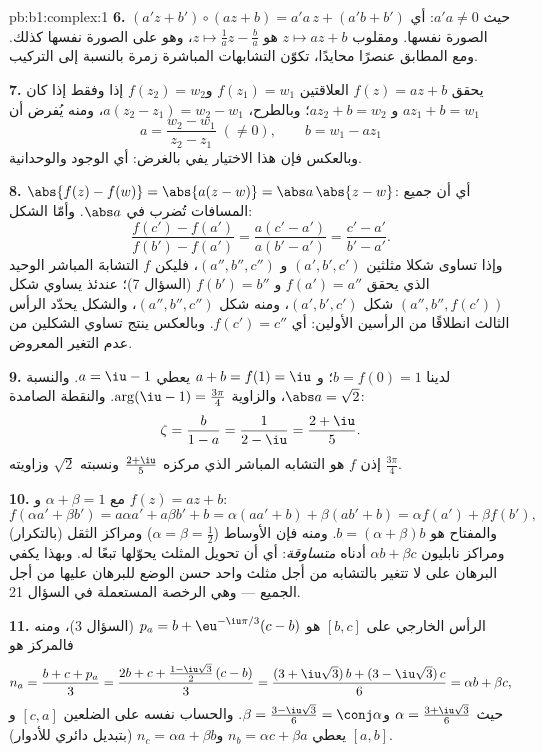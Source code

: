 \begin{solution}{pb:b1:complex:1}
\textbf{6.} $(a'z + b') \circ (az + b) = a'a\,z + (a'b + b')$ حيث
$a'a \neq 0$: أي الصورة نفسها. ومقلوب $z \mapsto az + b$ هو $z
\mapsto \frac1a z - \frac ba$، وهو على الصورة نفسها كذلك. ومع
 المطابق عنصرًا محايدًا، تكوّن التشابهات المباشرة
زمرة بالنسبة إلى التركيب.

\textbf{7.} يحقق $f(z) = az + b$ العلاقتين $f(z_1) = w_1$ و$f(z_2) =
w_2$ إذا وفقط إذا كان $a z_1 + b = w_1$ و $a z_2 + b = w_2$؛ وبالطرح،
$a(z_2 - z_1) = w_2 - w_1$، ومنه يُفرض أن
\[
a = \frac{w_2 - w_1}{z_2 - z_1} \;(\neq 0), \qquad
b = w_1 - a z_1
\]
وبالعكس فإن هذا الاختيار يفي بالغرض: أي الوجود
والوحدانية.

\textbf{8.} $\abs{f(z) - f(w)} = \abs{a(z - w)} = \abs a\,\abs{z -
w}$: أي أن جميع المسافات تُضرب في $\abs a$. وأمّا الشكل:
\[
\frac{f(c') - f(a')}{f(b') - f(a')} = \frac{a(c' -
a')}{a(b' - a')} = \frac{c' - a'}{b' - a'} .
\]
وإذا تساوى شكلا مثلثين $(a', b', c')$ و $(a'', b'', c'')$،
فليكن $f$ التشابهَ المباشر الوحيد الذي يحقق $f(a') = a''$
و $f(b') = b''$ (السؤال 7)؛ عندئذ يساوي شكل $(a'', b'',
f(c'))$ شكل $(a', b', c')$، ومنه شكل $(a'', b'',
c'')$، والشكل يحدّد الرأس الثالث انطلاقًا من الرأسين
الأولين: أي $f(c') = c''$. وبالعكس ينتج تساوي الشكلين من
عدم التغير المعروض.

\textbf{9.} لدينا $b = f(0) = 1$؛ و $a + b = f(1) = \iu$ يعطي $a = \iu -
1$. والنسبة $\abs a = \sqrt2$، والزاوية $\arg(\iu - 1) =
\frac{3\pi}4$. والنقطة الصامدة:
\[
\zeta = \frac{b}{1 - a} = \frac1{2 - \iu} = \frac{2 + \iu}5 .
\]
إذن $f$ هو التشابه المباشر الذي مركزه $\frac{2+\iu}5$ ونسبته
$\sqrt2$ وزاويته $\frac{3\pi}4$.

\textbf{10.} مع $\alpha + \beta = 1$ و $f(z) = az + b$:
\[
f(\alpha a' + \beta b') = a\alpha a' + a\beta b' + b
= \alpha(a a' + b) + \beta(a b' + b)
= \alpha f(a') + \beta f(b') ,
\]
والمفتاح هو $b = (\alpha + \beta)b$. ومنه فإن الأوساط ($\alpha = \beta =
\frac12$) ومراكز الثقل (بالتكرار) ومراكز نابليون $\alpha b
+ \beta c$ أدناه \emph{متساوقة}: أي أن تحويل
المثلث يحوّلها تبعًا له. وبهذا يكفي البرهان على  لا تتغير
بالتشابه من أجل مثلث واحد حسن الوضع للبرهان عليها من أجل الجميع
--- وهي الرخصة المستعملة في السؤال 21.

\textbf{11.} الرأس الخارجي على $[b, c]$ هو $p_a = b +
\eu^{-\iu\pi/3}(c - b)$ (السؤال 3)، ومنه فالمركز هو
\[
n_a = \frac{b + c + p_a}3
= \frac{2b + c + \frac{1 - \iu\sqrt3}2\,(c - b)}3
= \frac{(3 + \iu\sqrt3)\,b + (3 - \iu\sqrt3)\,c}6
= \alpha b + \beta c ,
\]
حيث $\alpha = \frac{3 + \iu\sqrt3}6$ و$\beta = \frac{3 -
\iu\sqrt3}6 = \conj\alpha$. والحساب نفسه على الضلعين
$[c, a]$ و $[a, b]$ يعطي $n_b = \alpha c + \beta a$ و$n_c =
\alpha a + \beta b$ (بتبديل دائري للأدوار).


\end{solution}
